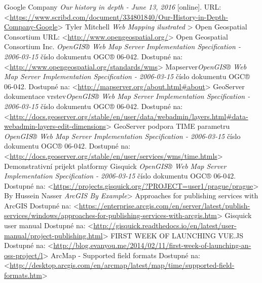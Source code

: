\documentclass[12pt,a4paper]{article}
\begin{document}
\newpage
\begin{thebibliography}{99}
\label{Bibliography}
Google Company \textit{Our history in depth - June 13, 2016} [online].
URL: \textless\url{https://www.scribd.com/document/334801840/Our-History-in-Depth-Company-Google}\textgreater
{}
Tyler Mitchell \textit{Web Mapping ilustrated }\textgreater
{}
Open Geospatial Consortium %
URL: \textless\url{http://www.opengeospatial.org/}\textgreater
{}
Open Geospatial Consortium Inc. \textit{OpenGIS® Web Map Server Implementation Specification - 2006-03-15} číslo dokumentu OGC® 06-042.
Dostupné na: \textless\url{http://www.opengeospatial.org/standards/wms}\textgreater
{}
Mapserver\textit{OpenGIS® Web Map Server Implementation Specification - 2006-03-15} číslo dokumentu OGC® 06-042.
Dostupné na: \textless\url{http://mapserver.org/about.html#about}\textgreater
{}
GeoServer dokumentace vrstev\textit{OpenGIS® Web Map Server Implementation Specification - 2006-03-15} číslo dokumentu OGC® 06-042.
Dostupné na: \textless\url{http://docs.geoserver.org/stable/en/user/data/webadmin/layers.html#data-webadmin-layers-edit-dimensions}\textgreater
{}
GeoServer podpora TIME parametru \textit{OpenGIS® Web Map Server Implementation Specification - 2006-03-15} číslo dokumentu OGC® 06-042.
Dostupné na: \textless\url{http://docs.geoserver.org/stable/en/user/services/wms/time.htmls}\textgreater
{}
Demonstrativní prijekt platformy Gisquick \textit{OpenGIS® Web Map Server Implementation Specification - 2006-03-15} číslo dokumentu OGC® 06-042.
Dostupné na: \textless\url{https://projects.gisquick.org/?PROJECT=user1/prague/prague}\textgreater
{}
By Hussein Nasser \textit{ArcGIS By Example}\textgreater
{}
Approaches for publishing services with ArcGIS \textit{}
Dostupné na: \textless\url{https://enterprise.arcgis.com/en/server/latest/publish-services/windows/approaches-for-publishing-services-with-arcgis.htm}\textgreater
{}
Gisquick user manual \textit{}
Dostupné na: \textless\url{http://gisquick.readthedocs.io/en/latest/user-manual/project-publishing.html}\textgreater
{}
FIRST WEEK OF LAUNCHING VUE.JS \textit{}
Dostupné na: \textless\url{http://blog.evanyou.me/2014/02/11/first-week-of-launching-an-oss-project/l}\textgreater
{}
ArcMap - Supported field formats \textit{}
Dostupné na: \textless\url{http://desktop.arcgis.com/en/arcmap/latest/map/time/supported-field-formats.htm}\textgreater


\end{thebibliography}
\end{document}
